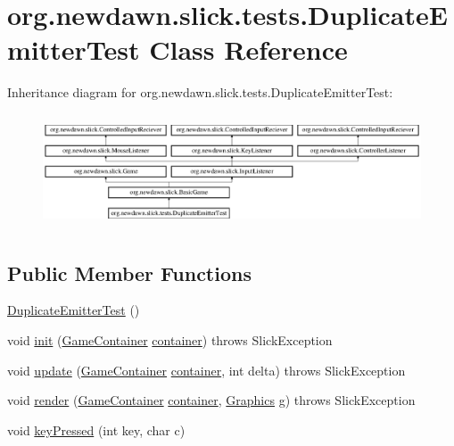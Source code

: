 \hypertarget{classorg_1_1newdawn_1_1slick_1_1tests_1_1_duplicate_emitter_test}{}\section{org.\+newdawn.\+slick.\+tests.\+Duplicate\+Emitter\+Test Class Reference}
\label{classorg_1_1newdawn_1_1slick_1_1tests_1_1_duplicate_emitter_test}
Inheritance diagram for org.\+newdawn.\+slick.\+tests.\+Duplicate\+Emitter\+Test\+:\begin{figure}[H]
\begin{center}
\leavevmode
\includegraphics[height=3.431373cm]{classorg_1_1newdawn_1_1slick_1_1tests_1_1_duplicate_emitter_test}
\end{center}
\end{figure}
\subsection*{Public Member Functions}
\begin{DoxyCompactItemize}
\item 
\mbox{\hyperlink{classorg_1_1newdawn_1_1slick_1_1tests_1_1_duplicate_emitter_test_a5f0beb98ae988b43e0960237b26cbb7d}{Duplicate\+Emitter\+Test}} ()
\item 
void \mbox{\hyperlink{classorg_1_1newdawn_1_1slick_1_1tests_1_1_duplicate_emitter_test_a82777b20d86f8acf92130dd142c750cd}{init}} (\mbox{\hyperlink{classorg_1_1newdawn_1_1slick_1_1_game_container}{Game\+Container}} \mbox{\hyperlink{classorg_1_1newdawn_1_1slick_1_1tests_1_1_duplicate_emitter_test_a1bd68c36e7b1214aa3633db618e0a7c5}{container}})  throws Slick\+Exception 
\item 
void \mbox{\hyperlink{classorg_1_1newdawn_1_1slick_1_1tests_1_1_duplicate_emitter_test_af62c2eca6105e5edad52e76a4a7f8e45}{update}} (\mbox{\hyperlink{classorg_1_1newdawn_1_1slick_1_1_game_container}{Game\+Container}} \mbox{\hyperlink{classorg_1_1newdawn_1_1slick_1_1tests_1_1_duplicate_emitter_test_a1bd68c36e7b1214aa3633db618e0a7c5}{container}}, int delta)  throws Slick\+Exception 
\item 
void \mbox{\hyperlink{classorg_1_1newdawn_1_1slick_1_1tests_1_1_duplicate_emitter_test_aa665fe1ee32c30eba15459ec1718eabc}{render}} (\mbox{\hyperlink{classorg_1_1newdawn_1_1slick_1_1_game_container}{Game\+Container}} \mbox{\hyperlink{classorg_1_1newdawn_1_1slick_1_1tests_1_1_duplicate_emitter_test_a1bd68c36e7b1214aa3633db618e0a7c5}{container}}, \mbox{\hyperlink{classorg_1_1newdawn_1_1slick_1_1_graphics}{Graphics}} g)  throws Slick\+Exception 
\item 
void \mbox{\hyperlink{classorg_1_1newdawn_1_1slick_1_1tests_1_1_duplicate_emitter_test_a99df8ebb859d8d2454cc3210bc44c91e}{key\+Pressed}} (int key, char c)
\end{DoxyCompactItemize}
